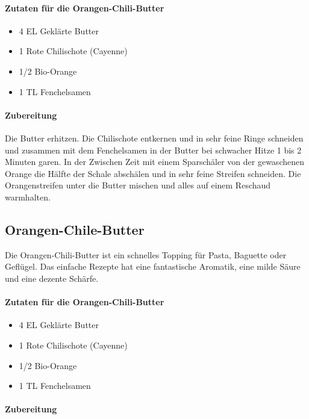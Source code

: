 \paragraph{Zutaten für die Orangen-Chili-Butter}

\begin{itemize}[noitemsep]
	\item 4 EL Geklärte Butter
	\item 1 Rote Chilischote (Cayenne)
	\item 1/2 Bio-Orange
	\item 1 TL Fenchelsamen
\end{itemize}

\paragraph{Zubereitung}

Die Butter erhitzen. Die Chilischote entkernen und in sehr feine Ringe schneiden 
und zusammen 
mit dem Fenchelsamen in der Butter bei 
schwacher Hitze 1 bis 2 Minuten garen. In der Zwischen Zeit mit einem 
Sparschäler von der 
gewaschenen Orange die Hälfte der Schale 
abschälen und in sehr feine Streifen schneiden. Die Orangenstreifen unter die 
Butter mischen 
und alles auf einem Reschaud warmhalten.

\subsection{Orangen-Chile-Butter}

Die Orangen-Chili-Butter ist ein schnelles Topping für Pasta, Baguette oder 
Geflügel. Das 
einfache Rezepte hat eine fantastische 
Aromatik, eine milde Säure und eine dezente Schärfe.

\paragraph{Zutaten für die Orangen-Chili-Butter}\label{OrangenChili}

\begin{itemize}[noitemsep]
	\item 4 EL Geklärte Butter
	\item 1 Rote Chilischote (Cayenne)
	\item 1/2 Bio-Orange
	\item 1 TL Fenchelsamen
\end{itemize}

\paragraph{Zubereitung}

